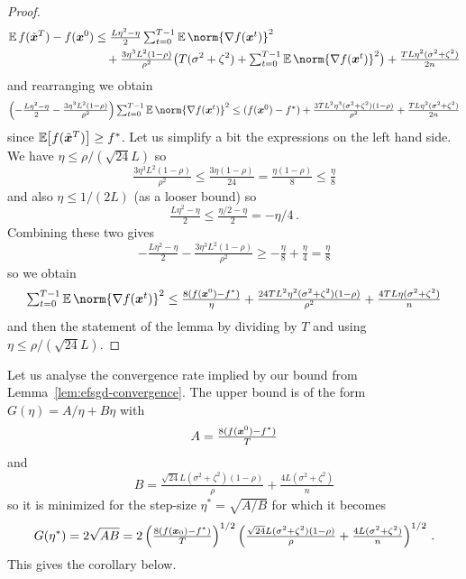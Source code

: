 \documentclass{article}
\begin{document}
\begin{proof}
  \begin{align*}
    \E f(\tilde \xx^T) - f(\xx^0)
     & \leq
    \tfrac{L\eta^2-\eta}{2} \tsum_{t=0}^{T-1} \E \norm{\nabla f(\xx^t)}^2
    \\
     & \quad
    + \tfrac{3 \eta^3 L^2 (1-\rho)}{\rho^2} \bigl( T (\sigma^2+\zeta^2) + \tsum_{t=0}^{T-1} \E \norm{\nabla f(\xx^t)}^2 \bigr)
    + \tfrac{T L \eta^2 (\sigma^2+\zeta^2)}{2n}
  \end{align*}
  and rearranging we obtain
  \[
    \left(-\tfrac{L\eta^2-\eta}{2} - \tfrac{3\eta^3 L^2 (1-\rho)}{\rho^2}\right) \tsum_{t=0}^{T-1} \E \norm{\nabla f(\xx^t)}^2
    \leq
    (f(\xx^0) - f^\ast) + \tfrac{3 T L^2 \eta^3 (\sigma^2+\zeta^2) (1-\rho)}{\rho^2} + \tfrac{TL \eta^2 (\sigma^2+\zeta^2)}{2n}
  \]
  since $\mathbb{\operatorname{\mathbb{E}}}_{\!\!}\left[f(\tilde {\bm{x}}^T)\right] \ge f^\ast$. Let us simplify a bit the expressions on the left hand side. We have $\eta \leq \rho / (\sqrt{24}L)$ so
  \[
    \tfrac{3\eta^3 L^2 (1-\rho)}{\rho^2} 
     \le 
    \tfrac{3\eta (1-\rho)}{24} 
     = 
    \tfrac{\eta (1-\rho)}{8} 
     \le 
    \tfrac{\eta}{8}
  \]
  and also $\eta \le 1/(2L)$ (as a looser bound) so
  \[
    \tfrac{L\eta^2 - \eta}{2} 
     \le 
    \tfrac{\eta/2 - \eta}{2} = -\eta / 4 \, .
  \]
  Combining these two gives
  \[
    -\tfrac{L\eta^2-\eta}{2} - \tfrac{3\eta^3 L^2 (1-\rho)}{\rho^2} 
     \ge 
    -\tfrac{\eta}{8} +\tfrac{\eta}{4} 
     = 
    \tfrac{\eta}{8}
  \]
  so we obtain
  \[
    \tsum_{t=0}^{T-1} \E \norm{\nabla f(\xx^t)}^2 
    \leq
    \tfrac{8(f(\xx^0) - f^\ast)}{\eta} + \tfrac{24 T L^2 \eta^2 (\sigma^2+\zeta^2) (1-\rho)}{\rho^2} + \tfrac{4 TL \eta (\sigma^2+\zeta^2)}{n}
  \]
  and then the statement of the lemma by dividing by $T$ and using $\eta \leq \rho/ (\sqrt{24} L)$.
\end{proof}


Let us analyse the convergence rate implied by our bound from Lemma~\ref{lem:efsgd-convergence}. The upper bound is of the form $G(\eta) = A/\eta + B \eta$ with
\[
  A = \tfrac{8(f(\bm{x}^0) - f^\ast)}{T}
\]
and
\[
  B = \tfrac{\sqrt{24} L (\sigma^2+\zeta^2) (1-\rho)}{\rho} + \tfrac{4 L (\sigma^2+\zeta^2)}{n}
\]
so it is minimized for the step-size $\eta^\ast = \sqrt{A/B}$ for which it becomes
\[
  G(\eta^\ast)
  =
  2\sqrt{AB}
  =
  2 \left(\tfrac{8(f(\bm{x}_0) - f^\ast)}{T} \right)^{1/2} \left(\tfrac{\sqrt{24} L (\sigma^2+\zeta^2) (1-\rho)}{\rho} + \tfrac{4 L (\sigma^2+\zeta^2)}{n}\right)^{1/2} \, .
\]
This gives the corollary below.
\end{document}
